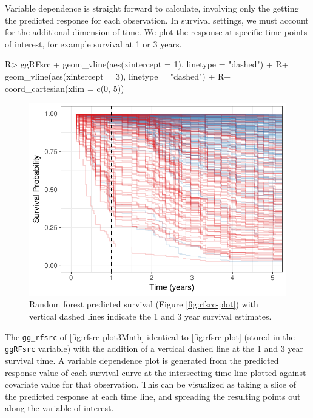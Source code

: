 \documentclass[article, nojss]{jss}
\begin{document}
Variable dependence is straight forward to calculate, involving only the
getting the predicted response for each observation. In survival
settings, we must account for the additional dimension of time. We plot
the response at specific time points of interest, for example survival
at 1 or 3 years.

\begin{Schunk}
\begin{Sinput}
R> ggRFsrc + geom_vline(aes(xintercept = 1), linetype = "dashed") +
R+    geom_vline(aes(xintercept = 3), linetype = "dashed") +
R+   coord_cartesian(xlim = c(0, 5))
\end{Sinput}
\begin{figure}[!htb]

{\centering \includegraphics{rfs-rfsrc-plot3Mnth-1}

}

\caption{Random forest predicted survival (Figure \ref{fig:rfsrc-plot}) with vertical dashed lines indicate the 1 and 3 year survival estimates.}\label{fig:rfsrc-plot3Mnth}
\end{figure}
\end{Schunk}

The \texttt{gg\_rfsrc} of \autoref{fig:rfsrc-plot3Mnth} identical to
\autoref{fig:rfsrc-plot} (stored in the \texttt{ggRFsrc} variable) with
the addition of a vertical dashed line at the 1 and 3 year survival
time. A variable dependence plot is generated from the predicted
response value of each survival curve at the intersecting time line
plotted against covariate value for that observation. This can be
visualized as taking a slice of the predicted response at each time
line, and spreading the resulting points out along the variable of
interest.
\end{document}
